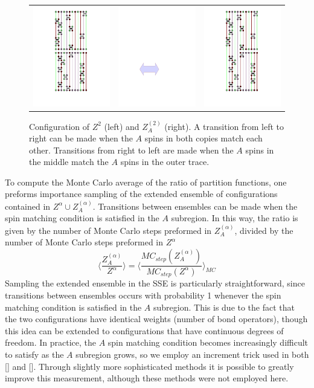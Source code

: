 \documentclass[aps,prb,reprint,floatfix]{revtex4-1}
\begin{document}
\begin{figure}[h]
\centering
\begin{tabular}{m{} m{} m{}} 
\includegraphics[width=.13\textwidth]{12chain_z2_test_cropped1.pdf} & 
\includegraphics[width=.07\textwidth,height=.03\textheight]{arrow2.pdf} &
\includegraphics[width=.13\textwidth]{12chain_mod_z2_test_cropped1.pdf} 
\end{tabular}
\caption{Configuration of $Z^{2}$ (left) and $Z^{(2)}_{A}$ (right).  A transition from left to right can be made when the $A$ spins in both copies match each other.  Transitions from right to left are made when the $A$ spins in the middle match the $A$ spins in the outer trace. }
\label{fig:ExtendedEnsemble}
\end{figure}



To compute the Monte Carlo average of the ratio of partition functions, one preforms importance sampling of the extended ensemble of configurations contained in $Z^{\alpha} \cup Z^{(\alpha)}_{A}$.  Transitions between ensembles can be made when the spin matching condition is satisfied in the $A$ subregion.  In this way, the ratio is given by the number of Monte Carlo steps preformed in $Z^{(\alpha)}_{A}$, divided by the number of Monte Carlo steps preformed in $Z^{\alpha}$
{\allowdisplaybreaks
\begin{equation}
\Bigg\langle\frac{Z^{(\alpha)}_{A}}{Z^{\alpha}}\Bigg\rangle=\Bigg\langle\frac{MC_{step}(Z^{(\alpha)}_{A})}{MC_{step}(Z^{\alpha})}\Bigg\rangle_{MC}	 
\label{eq:RatioAverage}
\end{equation}}Sampling the extended ensemble in the SSE is particularly straightforward, since transitions between ensembles occurs with probability 1 whenever the spin matching condition is satisfied in the $A$ subregion.  This is due to the fact that the two configurations have identical weights (number of bond operators), though this idea can be extended to configurations that have continuous degrees of freedom.\cite{Humeniuk2012:ExtendedEnsemble}  In practice, the $A$ spin matching condition becomes increasingly difficult to satisfy as the $A$ subregion grows, so we employ an increment trick used in both [] and [].  Through slightly more sophisticated methods\cite{Luitz2014:ImprovingRenyiQMC} it is possible to greatly improve this measurement, although these methods were not employed here.    
\end{document}
